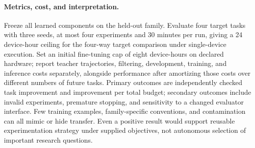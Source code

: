 \paragraph{Metrics, cost, and interpretation.}
Freeze all learned components on the held-out family. Evaluate four target tasks with three seeds, at most four experiments and 30 minutes per run, giving a 24 device-hour ceiling for the four-way target comparison under single-device execution. Set an initial fine-tuning cap of eight device-hours on declared hardware; report teacher trajectories, filtering, development, training, and inference costs separately, alongside performance after amortizing those costs over different numbers of future tasks. Primary outcomes are independently checked task improvement and improvement per total budget; secondary outcomes include invalid experiments, premature stopping, and sensitivity to a changed evaluator interface. Few training examples, family-specific conventions, and contamination can all mimic or hide transfer. Even a positive result would support reusable experimentation strategy under supplied objectives, not autonomous selection of important research questions.
